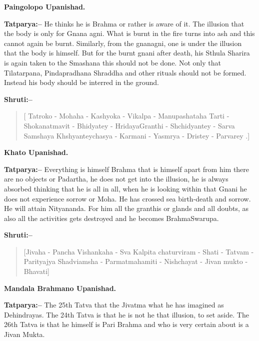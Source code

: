 \begin{flushright}
\textbf{Paingolopo Upanishad.}
\end{flushright}

\textbf{Tatparya:–} He thinks he is Brahma or rather is aware of it. The illusion that the body is only for Gnana agni. What is burnt in the fire turns into ash and this cannot again be burnt. Similarly, from the gnanagni, one is under the illusion that the body is himself. But for the burnt gnani after death, his Sthula Sharira is again taken to the Smashana this should not be done. Not only that Tilatarpana, Pindapradhana Shraddha and other rituals should not be formed. Instead his body should be interred in the ground.

\textbf{Shruti:–}

\begin{verse}
[ Tatroko - Mohaha - Kashyoka - Vikalpa - Manupasha\break taha  Tarti - Shokanatmavit - Bhidyatey - Hridaya\break Granthi - Shchidyantey - Sarva Samshaya  Khshyanteychasya - Karmani - Yasmrya - Dristey - Parvarey .]
\end{verse}

\begin{flushright}
\textbf{Khato Upanishad.}
\end{flushright}

\textbf{Tatparya:–} Everything is himself Brahma that is himself apart from him there are no objects or Padartha, he does not get into the illusion, he is always absorbed thinking that he is all in all, when he is looking within that Gnani he does not experience sorrow or Moha. He has crossed sea birth-death and sorrow. He will attain Nityananda. For him all the granthis or glands and all doubts, as also all the activities gets destroyed and he becomes BrahmaSwarupa.

\textbf{Shruti:–}

\begin{verse}
[Jivaha - Pancha Vishankaha - Sva Kalpita chaturviram - Shati - Tatvam - Parityajya  Shadviamsha - Parmatmahamiti - Nishchayat - Jivan mukto - Bhavati]
\end{verse}

\begin{flushright}
\textbf{Mandala Brahmano Upanishad.}
\end{flushright}

\textbf{Tatparya:–} The 25th Tatva that the Jivatma what he has imagined as Dehindrayas. The 24th Tatva is that he is not he that illusion, to set aside. The 26th Tatva is that he himself is Pari Brahma and who is very certain about is a Jivan Mukta.

